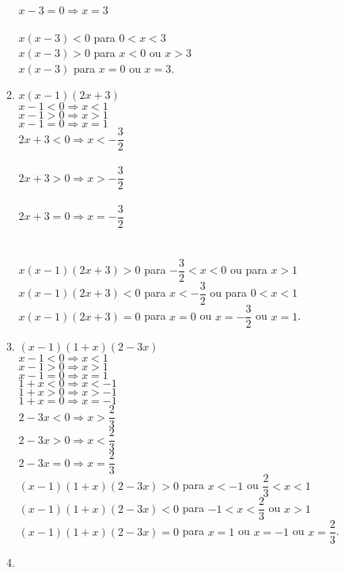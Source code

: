 \begin{enumerate}
\begin{enumerate}
		$x - 3 = 0 \Rightarrow x = 3$ \\
		\\
		$x(x - 3) < 0$ para $0 < x < 3$\\
		$x(x - 3) > 0$ para $x < 0$ ou $x > 3$\\
		$x(x - 3)$ para $x = 0$ ou $x = 3$.
		\addtocounter{enumii}{1}
		\item
		$x(x - 1)(2x + 3)$\\
		$x - 1 < 0 \Rightarrow x < 1$\\
		$x - 1 > 0 \Rightarrow x > 1$\\
		$x - 1 = 0 \Rightarrow x = 1$\\		
		$2x + 3 < 0 \Rightarrow x < -\dfrac{3}{2}$\\\\
		$2x + 3 > 0 \Rightarrow x > -\dfrac{3}{2}$\\\\
		$2x + 3 = 0 \Rightarrow x = -\dfrac{3}{2}$\\\\
		\\
		$x(x - 1)(2x + 3) > 0$ para $-\dfrac{3}{2} < x < 0$ ou para $x > 1$\\
		$x(x - 1)(2x + 3) < 0$ para $x < -\dfrac{3}{2}$ ou para $0 < x < 1$\\
		$x(x - 1)(2x + 3) = 0$ para $x = 0$ ou $x = -\dfrac{3}{2}$ ou $x = 1$.
		\item
		$(x - 1)(1 + x)(2 - 3x)$\\
		$x - 1 < 0 \Rightarrow x < 1$\\
		$x - 1 > 0 \Rightarrow x > 1$\\
		$x - 1 = 0 \Rightarrow x = 1$\\
		$1 + x < 0 \Rightarrow x < -1$\\
		$1 + x > 0 \Rightarrow x > -1$\\
		$1 + x = 0 \Rightarrow x = -1$\\[6pt]
		$2 - 3x < 0 \Rightarrow x > \dfrac{2}{3}$\\[6pt]
		$2 - 3x > 0 \Rightarrow x < \dfrac{2}{3}$\\[6pt]
		$2 - 3x = 0 \Rightarrow x = \dfrac{2}{3}$\\[6pt]
		$(x - 1)(1 + x)(2 - 3x) > 0$ para $x < -1$ ou $\dfrac{2}{3} < x < 1$\\[6pt]
		$(x - 1)(1 + x)(2 - 3x) < 0$ para $-1 < x < \dfrac{2}{3}$ ou $x > 1$\\[6pt]
		$(x - 1)(1 + x)(2 - 3x) = 0$ para $x = 1$ ou $x = -1$ ou $x = \dfrac{2}{3}$.
		\item

\end{enumerate}
\end{enumerate}
